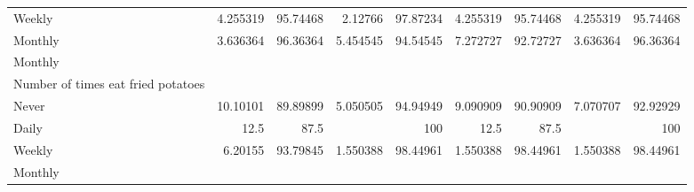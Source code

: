 \documentclass{article}
\begin{document}
\begin{tabular}{lllllllll}
\multicolumn{1}{l}{\hspace{7em}Weekly} &
  \multicolumn{1}{|r}{4.255319} &
  \multicolumn{1}{r}{95.74468} &
  \multicolumn{1}{r}{2.12766} &
  \multicolumn{1}{r}{97.87234} &
  \multicolumn{1}{r}{4.255319} &
  \multicolumn{1}{r}{95.74468} &
  \multicolumn{1}{r}{4.255319} &
  \multicolumn{1}{r}{95.74468} \\
\multicolumn{1}{l}{\hspace{7em}Monthly} &
  \multicolumn{1}{|r}{3.636364} &
  \multicolumn{1}{r}{96.36364} &
  \multicolumn{1}{r}{5.454545} &
  \multicolumn{1}{r}{94.54545} &
  \multicolumn{1}{r}{7.272727} &
  \multicolumn{1}{r}{92.72727} &
  \multicolumn{1}{r}{3.636364} &
  \multicolumn{1}{r}{96.36364} \\
\multicolumn{1}{l}{\hspace{5em}Monthly} &
  \multicolumn{1}{|r}{} &
  \multicolumn{1}{r}{} &
  \multicolumn{1}{r}{} &
  \multicolumn{1}{r}{} &
  \multicolumn{1}{r}{} &
  \multicolumn{1}{r}{} &
  \multicolumn{1}{r}{} &
  \multicolumn{1}{r}{} \\
\multicolumn{1}{l}{\hspace{6em}Number of times eat fried potatoes} &
  \multicolumn{1}{|r}{} &
  \multicolumn{1}{r}{} &
  \multicolumn{1}{r}{} &
  \multicolumn{1}{r}{} &
  \multicolumn{1}{r}{} &
  \multicolumn{1}{r}{} &
  \multicolumn{1}{r}{} &
  \multicolumn{1}{r}{} \\
\multicolumn{1}{l}{\hspace{7em}Never} &
  \multicolumn{1}{|r}{10.10101} &
  \multicolumn{1}{r}{89.89899} &
  \multicolumn{1}{r}{5.050505} &
  \multicolumn{1}{r}{94.94949} &
  \multicolumn{1}{r}{9.090909} &
  \multicolumn{1}{r}{90.90909} &
  \multicolumn{1}{r}{7.070707} &
  \multicolumn{1}{r}{92.92929} \\
\multicolumn{1}{l}{\hspace{7em}Daily} &
  \multicolumn{1}{|r}{12.5} &
  \multicolumn{1}{r}{87.5} &
  \multicolumn{1}{r}{} &
  \multicolumn{1}{r}{100} &
  \multicolumn{1}{r}{12.5} &
  \multicolumn{1}{r}{87.5} &
  \multicolumn{1}{r}{} &
  \multicolumn{1}{r}{100} \\
\multicolumn{1}{l}{\hspace{7em}Weekly} &
  \multicolumn{1}{|r}{6.20155} &
  \multicolumn{1}{r}{93.79845} &
  \multicolumn{1}{r}{1.550388} &
  \multicolumn{1}{r}{98.44961} &
  \multicolumn{1}{r}{1.550388} &
  \multicolumn{1}{r}{98.44961} &
  \multicolumn{1}{r}{1.550388} &
  \multicolumn{1}{r}{98.44961} \\
\multicolumn{1}{l}{\hspace{7em}Monthly} &

\end{tabular}
\end{document}
